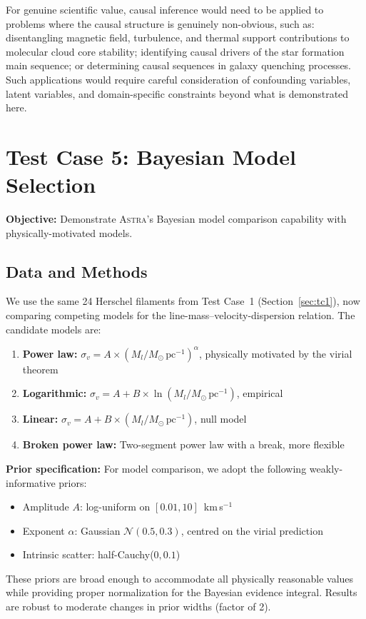 \documentclass[usenatbib]{rasti}
\newcommand{\astra}{\textsc{Astra}\xspace}
\begin{document}
For genuine scientific value, causal inference would need to be applied to problems where the causal structure is genuinely non-obvious, such as: disentangling magnetic field, turbulence, and thermal support contributions to molecular cloud core stability; identifying causal drivers of the star formation main sequence; or determining causal sequences in galaxy quenching processes.
Such applications would require careful consideration of confounding variables, latent variables, and domain-specific constraints beyond what is demonstrated here.

\section{Test Case 5: Bayesian Model Selection}
\label{sec:tc5}

\textbf{Objective:} Demonstrate \astra's Bayesian model comparison capability with physically-motivated models.

\subsection{Data and Methods}
\label{sec:tc5:data}

We use the same 24 Herschel filaments from Test Case~1 (Section~\ref{sec:tc1}), now comparing competing models for the line-mass--velocity-dispersion relation.
The candidate models are:
\begin{enumerate}
  \item[(i)] \textbf{Power law:} $\sigma_v = A \times (M_l/M_\odot\,\mathrm{pc}^{-1})^{\alpha}$, physically motivated by the virial theorem
  \item[(ii)] \textbf{Logarithmic:} $\sigma_v = A + B \times \ln(M_l/M_\odot\,\mathrm{pc}^{-1})$, empirical
  \item[(iii)] \textbf{Linear:} $\sigma_v = A + B \times (M_l/M_\odot\,\mathrm{pc}^{-1})$, null model
  \item[(iv)] \textbf{Broken power law:} Two-segment power law with a break, more flexible
\end{enumerate}

\textbf{Prior specification:}
For model comparison, we adopt the following weakly-informative priors:
\begin{itemize}
  \item Amplitude $A$: log-uniform on $[0.01, 10]$~km\,s$^{-1}$
  \item Exponent $\alpha$: Gaussian $\mathcal{N}(0.5, 0.3)$, centred on the virial prediction
  \item Intrinsic scatter: half-Cauchy($0, 0.1$)
\end{itemize}
These priors are broad enough to accommodate all physically reasonable values while providing proper normalization for the Bayesian evidence integral.
Results are robust to moderate changes in prior widths (factor of 2).
\end{document}
